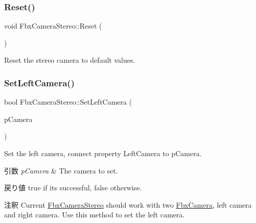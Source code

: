 \subsubsection{\texorpdfstring{Reset()}{Reset()}}
{\footnotesize\ttfamily void Fbx\+Camera\+Stereo\+::\+Reset (\begin{DoxyParamCaption}{ }\end{DoxyParamCaption})}



Reset the stereo camera to default values. 

\mbox{\label{class_fbx_camera_stereo_a3f6d9d09dd4ec6f9fe1b1b829f26a11f}} 
\subsubsection{\texorpdfstring{Set\+Left\+Camera()}{SetLeftCamera()}}
{\footnotesize\ttfamily bool Fbx\+Camera\+Stereo\+::\+Set\+Left\+Camera (\begin{DoxyParamCaption}\item[{\hyperlink{class_fbx_camera}{Fbx\+Camera} $\ast$}]{p\+Camera }\end{DoxyParamCaption})}

Set the left camera, connect property Left\+Camera to p\+Camera. 
\begin{DoxyParams}{引数}
{\em p\+Camera} & The camera to set. \\
\hline
\end{DoxyParams}
\begin{DoxyReturn}{戻り値}
{\ttfamily true} if it\textquotesingle{}s successful, {\ttfamily false} otherwise. 
\end{DoxyReturn}
\begin{DoxyRemark}{注釈}
Current \hyperlink{class_fbx_camera_stereo}{Fbx\+Camera\+Stereo} should work with two \hyperlink{class_fbx_camera}{Fbx\+Camera}, left camera and right camera. Use this method to set the left camera. 
\end{DoxyRemark}
\mbox{\label{class_fbx_camera_stereo_a9b37a67b3bf1e94a6845077913083d78}} 
